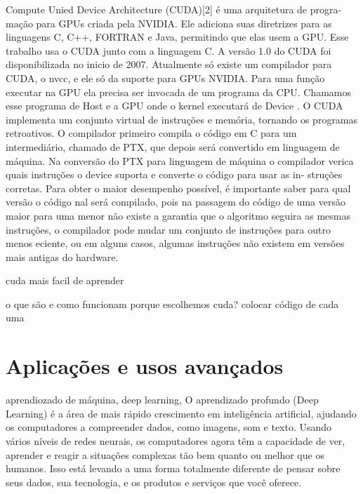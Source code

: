 Compute Unied Device Architecture (CUDA)[2] é uma arquitetura de progra-
mação para GPUs criada pela NVIDIA. Ele adiciona suas diretrizes para as
linguagens C, C++, FORTRAN e Java, permitindo que elas usem a GPU. Esse
trabalho usa o CUDA junto com a linguagem C. A versão 1.0 do CUDA foi
disponibilizada no inicio de 2007. Atualmente só existe um compilador para
CUDA, o nvcc, e ele só da suporte para GPUs NVIDIA.
Para uma função executar na GPU ela precisa ser invocada de um programa
da CPU. Chamamos esse programa de Host e a GPU onde o kernel executará
de Device .
O CUDA implementa um conjunto virtual de instruções e memória, tornando
os programas retroativos. O compilador primeiro compila o código em C para
um intermediário, chamado de PTX, que depois será convertido em linguagem
de máquina. Na conversão do PTX para linguagem de máquina o compilador
verica quais instruções o device suporta e converte o código para usar as in-
struções corretas. Para obter o maior desempenho possível, é importante saber
para qual versão o código nal será compilado, pois na passagem do código de
uma versão maior para uma menor não existe a garantia que o algoritmo seguira
as mesmas instruções, o compilador pode mudar um conjunto de instruções para
outro menos eciente, ou em alguns casos, algumas instruções não existem em
versões mais antigas do hardware.


cuda mais facil de aprender


  o que são e como funcionam
  porque escolhemos cuda?
  colocar código de cada uma

\section{Aplicações e usos avançados}

aprendiozado de máquina, deep learning,
O aprendizado profundo (Deep Learning) é a área de mais rápido crescimento em inteligência artificial, ajudando os computadores a compreender dados, como imagens, som e texto. Usando vários níveis de redes neurais, os computadores agora têm a capacidade de ver, aprender e reagir a situações complexas tão bem quanto ou melhor que os humanos. Isso está levando a uma forma totalmente diferente de pensar sobre seus dados, sua tecnologia, e os produtos e serviços que você oferece.

